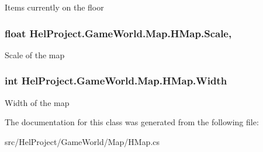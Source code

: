 Items currently on the floor 

\hypertarget{class_hel_project_1_1_game_world_1_1_map_1_1_h_map_a023973ffc8b857d992378e235632021c}{}
\subsubsection[{Scale}]{\setlength{\rightskip}{0pt plus 5cm}float Hel\+Project.\+Game\+World.\+Map.\+H\+Map.\+Scale\hspace{0.3cm}{\ttfamily [get]}, {\ttfamily [set]}}\label{class_hel_project_1_1_game_world_1_1_map_1_1_h_map_a023973ffc8b857d992378e235632021c}


Scale of the map 

\hypertarget{class_hel_project_1_1_game_world_1_1_map_1_1_h_map_aeb3db69a653089c32c2b61c7612bd106}{}
\subsubsection[{Width}]{\setlength{\rightskip}{0pt plus 5cm}int Hel\+Project.\+Game\+World.\+Map.\+H\+Map.\+Width\hspace{0.3cm}{\ttfamily [get]}}\label{class_hel_project_1_1_game_world_1_1_map_1_1_h_map_aeb3db69a653089c32c2b61c7612bd106}


Width of the map 



The documentation for this class was generated from the following file\+:\begin{DoxyCompactItemize}
\item 
src/\+Hel\+Project/\+Game\+World/\+Map/H\+Map.\+cs\end{DoxyCompactItemize}
